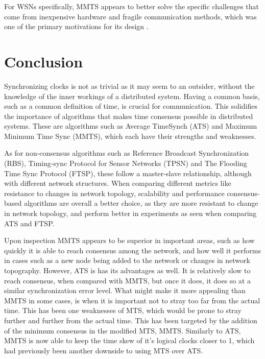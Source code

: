 \documentclass[a4paper,12pt]{article}
\begin{document}
For WSNs specifically, MMTS appears to better solve the specific challenges that come from inexpensive hardware and fragile communication methods, which was one of the primary motivations for its design \citep{HeLiChenCheng13}.

\section{Conclusion}
Synchronizing clocks is not as trivial as it may seem to an outsider, without the knowledge of the inner workings of a distributed system. Having a common basis, such as a common definition of time, is crucial for communication. This solidifies the importance of algorithms that makes time consensus possible in distributed systems. These are algorithms such as Average TimeSynch (ATS) and Maximum Minimum Time Sync (MMTS), which each have their strengths and weaknesses.

As for non-consensus algorithms such as Reference Broadcast Synchronization (RBS), Timing-sync Protocol for Sensor Networks (TPSN) and The Flooding Time Sync Protocol (FTSP), these follow a master-slave relationship, although with different network structures. When comparing different metrics like resistance to changes in network topology, scalability and performance consensus-based algorithms are overall a better choice, as they are more resistant to change in network topology, and perform better in experiments as seen when comparing ATS and FTSP. 

Upon inspection MMTS appears to be superior in important areas, such as how quickly it is able to reach consensus among the network, and how well it performs in cases such as a new node being added to the network or changes in network topography. However, ATS is has its advantages as well. It is relatively slow to reach consensus, when compared with MMTS, but once it does, it does so at a similar synchronization error level. 
What might make it more appealing than MMTS in some cases, is when it is important not to stray too far from the actual time. 
This has been one weaknesses of MTS, which would be prone to stray further and further from the actual time. This has been targeted by the addition of the minimum consensus in the modified MTS, MMTS. Similarly to ATS, MMTS is now able to keep the time skew of it's logical clocks closer to 1, which had previously been another downside to using MTS over ATS.
\end{document}

